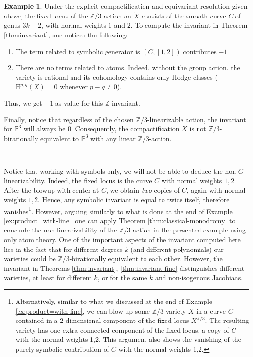 \documentclass[12pt,a4paper]{amsart}
\theoremstyle{definition}
\newtheorem{example}[theorem]{Example}
\theoremstyle{remark}
\newcommand{\Z}{\mathbb{Z}}
\begin{document}
\begin{example}
Under the explicit compactification and equivariant resolution given above, the fixed locus of the $\mathbb{Z}/3$-action on $\widetilde X$ consists of the smooth curve $C$ of genus $3k-2$, with normal weights $1$ and $2$. To compute the invariant in Theorem \ref{thm:invariant}, one notices the following: 
\begin{enumerate}
    \item The term related to symbolic generator is \((C, [1, 2])\) contributes $-1$
    \item There are no terms related to atoms. Indeed, without the group action, the variety is rational and its cohomology contains only Hodge classes (\(\mathrm{H}^{p,q}(X) = 0\) whenever \(p-q \neq 0\)). 
\end{enumerate}
Thus, we get \(-1\) as value for this \(\mathbb{Z}\)-invariant. 

Finally, notice that regardless of the chosen \(\mathbb{Z}/3\)-linearizable action, the invariant for \(\mathbb{P}^3\) will always be \(0\). Consequently, the compactification \(\widetilde{X}\) is not \(\mathbb{Z}/3\)-birationally equivalent to \(\mathbb{P}^3\) with any linear \(\mathbb{Z}/3\)-action. 


\

Notice that working with symbols only, we will not be able to deduce the non-\( G \)-linearizability. Indeed, the fixed locus is the curve $C$ with normal weights $1,2$. 
After the blowup with center at $C$, we obtain \textit{two} copies of $C$, again with normal weights $1,2$. Hence, any symbolic invariant is equal to twice itself, therefore vanishes\footnote{Alternatively, similar to what we discussed at the end of Example \ref{ex:product=with-line}, we can blow up some $\Z/3$-variety $X$ in a curve $C$ contained in a 2-dimensional component of the fixed locus $X^{\Z/3}$. The resulting variety has one extra connected component of the fixed locus, a copy of $C$ with the normal weights 1,2. This argument also shows the vanishing of the purely symbolic contribution of $C$ with the normal weights 1,2.}. However, arguing similarly to what is done at the end of Example \ref{ex:product=with-line}, one can apply Theorem \ref{thm:classical-monodromy} to conclude the non-linearizability of the $\mathbb Z/3$-action in the presented example using only atom theory. One of the important aspects of the invariant computed here lies in the fact that for different degrees $k$ (and different polynomials) our varieties could be $\mathbb Z/3$-birationally equivalent to each other. However, the invariant in Theorems \ref{thm:invariant}, \ref{thm:invariant-fine} distinguishes different varieties, at least for different $k$, or for the same $k$ and non-isogenous Jacobians.
\end{example}
\end{document}
